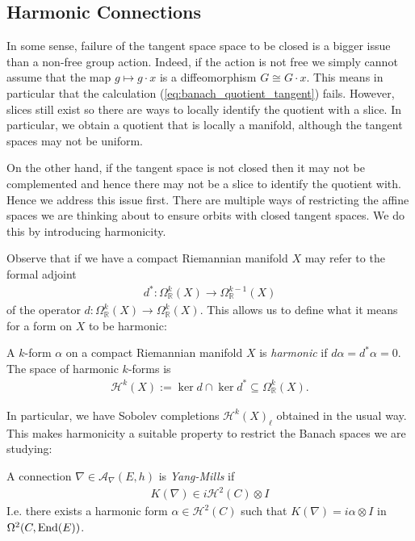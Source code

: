 \documentclass[12pt]{ociamthesis}  %
\begin{document}
\subsection{Harmonic Connections}

In some sense, failure of the tangent space space to be closed is a bigger issue than
a non-free group action. Indeed, if the action is not free we simply cannot assume that
the map $g\mapsto g\cdot x$ is a diffeomorphism $G\cong G\cdot x$. This means in particular
that the calculation
(\ref{eq:banach_quotient_tangent}) fails. However, slices still exist so there are ways to
locally identify the quotient with a slice. In particular, we obtain a quotient that is
locally a manifold, although the tangent spaces may not be uniform.

On the other hand, if the tangent space is not closed then it may not be complemented and
hence there may not be a slice to identify the quotient with. Hence we address this issue first.
There are multiple ways of restricting the affine spaces we are thinking about to
ensure orbits with closed tangent spaces. We do this by introducing harmonicity.

Observe that if we have a compact Riemannian manifold $X$ may refer to the
formal adjoint
\begin{align*}
  d^* : \Omega^k_{\mathbb{R}}(X)\to \Omega^{k-1}_{\mathbb{R}}(X)
\end{align*}
of the operator $d : \Omega^k_{\mathbb{R}}(X)\to\Omega^k_{\mathbb{R}}(X)$. This allows us to
define what it means for a form on $X$ to be harmonic:

\begin{definition}
  A $k$-form $\alpha$ on a compact Riemannian manifold $X$ is \emph{harmonic} if
  $d \alpha = d^* \alpha = 0$. The space of harmonic $k$-forms is
  \begin{align*}
    \mathcal H^k(X) := \ker d \cap \ker d^* \subseteq \Omega^k_{\mathbb{R}}(X).
  \end{align*}
\end{definition}

In particular, we have Sobolev completions $\mathcal H^k(X)_\ell$
obtained in the usual way. This makes harmonicity a suitable property to
restrict the Banach spaces we are studying:

\begin{definition}
  A connection $\nabla\in \mathcal A_\nabla(E,h)$ is \emph{Yang-Mills} if
  \begin{align}\label{eq:yang_mills_condition}
    K(\nabla) \in i\mathcal H^2(C)\otimes I
  \end{align}
  I.e. there exists a harmonic form $\alpha\in\mathcal H^2(C)$ such
  that $K(\nabla) = i\alpha\otimes I$ in $\Omega^2(C,\operatorname{End}(E))$.
\end{definition}
\end{document}
